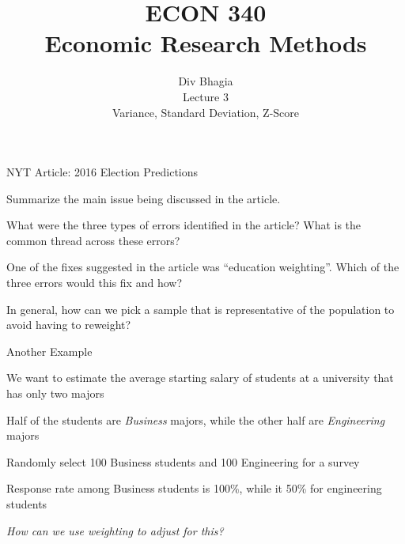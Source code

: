 \documentclass{./../div_teaching_slides}
\begin{document}
\title{ECON 340 \\ Economic Research Methods}
\author{Div Bhagia \\\vspace{1.75em}
Lecture 3 \\\vspace{0.25em} \small Variance, Standard Deviation, Z-Score}
\date{}

\begin{frame}
\maketitle
\end{frame}

\begin{frame}{NYT Article: 2016 Election Predictions}
\begin{witemize}
  \item Summarize the main issue being discussed in the article.
  \item What were the three types of errors identified in the article? What is the common thread across these errors?
  \item One of the fixes suggested in the article was ``education weighting''. Which of the three errors would this fix and how? \pause 
  \item In general, how can we pick a sample that is representative of the population to avoid having to reweight?
\end{witemize}
\end{frame}

\begin{frame}{Another Example}
\vspace{-0.5em}
\begin{witemize}
	\item We want to estimate the average starting salary of students at a university that has only two majors	\item Half of the students are \textit{Business} majors, while the other half are \textit{Engineering} majors
	\item Randomly select 100 Business students and 100 Engineering for a survey
	\item Response rate among Business students is 100\%, while it 50\% for engineering students 
	\item[] \textit{How can we use weighting to adjust for this?}
\end{witemize}
\end{frame}	
\end{document}
